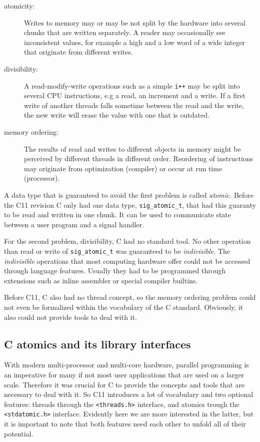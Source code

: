 \begin{description}
\item[{atomicity:}] Writes to memory may or may be not split by the
hardware into several chunks that are written
separately. A reader may occasionally see
inconsistent values, for example a high and a low
word of a wide integer that originate from different
writes.\itemadjust
\item[{divisibility:}] A read-modify-write operations such as a simple
\texttt{i++} may be split into several CPU instructions,
e.g a read, an increment and a write. If a first
write of another threads falls sometime between
the read and the write, the new write will erase
the value with one that is outdated.\itemadjust
\item[{memory ordering:}] The results of read and writes to different
objects in memory might be perceived by different threads in
different order. Reordering of instructions may originate from
optimization (compiler) or occur at run time (processor).
\end{description}

\vspace*{-3ex}
A data type that is guaranteed to avoid the first problem is called
\emph{atomic}. Before the C11 revision C only had one data type,
\texttt{sig\_atomic\_t}, that had this guaranty to be read and written in one
chunk. It can be used to communicate state between a user program
and a signal handler.

For the second problem, divisibility, C had no standard tool. No
other operation than read or write of \texttt{sig\_atomic\_t} was guaranteed
to be \emph{indivisible}.  The \emph{indivisible} operations that most
computing hardware offer could not be accessed through language
features. Usually they had to be programmed through extensions such
as inline assembler or special compiler builtins.

Before C11, C also had no thread concept, so the memory ordering
problem could not even be formalized within the vocabulary of the C
standard. Obviously, it also could not provide tools to deal with
it.

\subsection{C atomics and its library interfaces}
\label{sec-2-1}

With modern multi-processor and multi-core hardware, parallel
programming is an imperative for many if not most user applications
that are used on a larger scale. Therefore it was crucial for C to
provide the concepts and tools that are necessary to deal with
it. So C11 introduces a lot of vocabulary and two optional
features: threads through the \texttt{<threads.h>} interface, and atomics
trough the \texttt{<stdatomic.h>} interface. Evidently here we are more
interested in the latter, but it is important to note that both
features need each other to unfold all of their potential.

